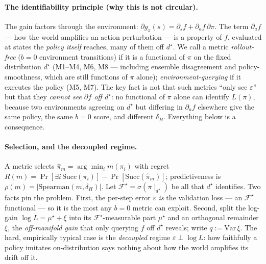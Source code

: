 \paragraph{The identifiability principle (why this is not circular).} The gain factors through the
environment: $\partial g_\pi(s)=\partial_s f + \partial_a f\,\partial\pi$. The term $\partial_a f$ ---
how the world amplifies an action perturbation --- is a property of $f$, evaluated at states the
\emph{policy itself} reaches, many of them off $d^\star$. We call a metric \emph{rollout-free} ($b{=}0$
environment transitions) if it is a functional of $\pi$ on the fixed distribution $d^\star$ (M1--M4,
M6, M8 --- including ensemble disagreement and policy-smoothness, which are still functions of $\pi$
alone); \emph{environment-querying} if it executes the policy (M5, M7). The key fact is not that such
metrics ``only see $\varepsilon$'' but that they \emph{cannot see $\partial f$ off $d^\star$}: no
functional of $\pi$ alone can identify $L(\pi)$, because two environments agreeing on $d^\star$ but
differing in $\partial_a f$ elsewhere give the same policy, the same $b{=}0$ score, and different
$\delta_H$. Everything below is a consequence.

\paragraph{Selection, and the decoupled regime.} A metric selects $\hat\pi_m=\arg\min_i m(\pi_i)$ with
regret $R(m)=\Pr[\exists i\,\mathrm{Succ}(\pi_i)]-\Pr[\mathrm{Succ}(\hat\pi_m)]$; predictiveness is
$\rho(m)=|\mathrm{Spearman}(m,\delta_H)|$. Let $\mathcal F^\star=\sigma(\pi\!\mid_{d^\star})$ be all that
$d^\star$ identifies. Two facts pin the problem. First, the per-step error $\varepsilon$ \emph{is} the
validation loss --- an $\mathcal F^\star$ functional --- so it is the most any $b{=}0$ metric can
exploit. Second, split the log-gain $\log L=\mu^\star+\xi$ into its $\mathcal F^\star$-measurable part
$\mu^\star$ and an orthogonal remainder $\xi$, the \emph{off-manifold gain} that only querying $f$ off
$d^\star$ reveals; write $q:=\mathrm{Var}\,\xi$. The hard, empirically typical case is the
\emph{decoupled} regime $\varepsilon\perp\log L$: how faithfully a policy imitates on-distribution says
nothing about how the world amplifies its drift off it.

